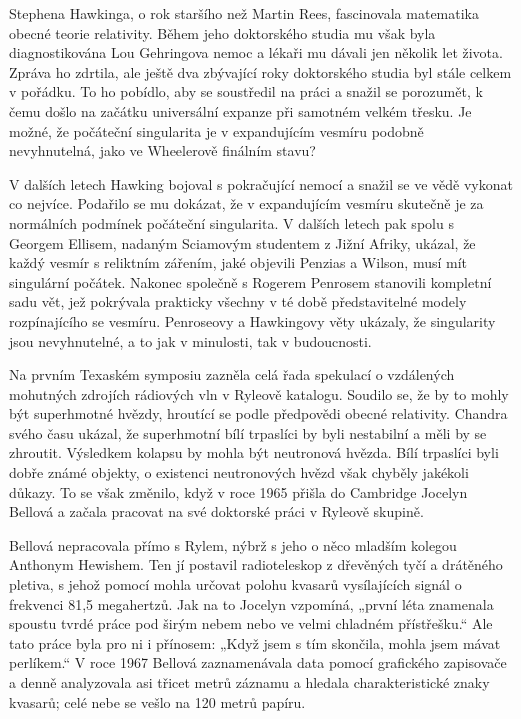   Stephena Hawkinga, o rok staršího než Martin Rees, fascinovala matematika obecné teorie
  relativity. Během jeho doktorského studia mu však byla diagnostikována Lou Gehringova nemoc a
  lékaři mu dávali jen několik let života. Zpráva ho zdrtila, ale ještě dva zbývající roky
  doktorského studia byl stále celkem v pořádku. To ho pobídlo, aby se soustředil na práci a snažil
  se porozumět, k čemu došlo na začátku universální expanze při samotném velkém třesku. Je možné, že
  počáteční singularita je v expandujícím vesmíru podobně nevyhnutelná, jako ve Wheelerově finálním
  stavu? 

  V dalších letech Hawking bojoval s pokračující nemocí a snažil se ve vědě vykonat co nejvíce.
  Podařilo se mu dokázat, že v expandujícím vesmíru skutečně je za normálních podmínek počáteční
  singularita. V dalších letech pak spolu s Georgem Ellisem, nadaným Sciamovým studentem z Jižní
  Afriky, ukázal, že každý vesmír s reliktním zářením, jaké objevili Penzias a Wilson, musí mít
  singulární počátek. Nakonec společně s Rogerem Penrosem stanovili kompletní sadu vět, jež
  pokrývala prakticky všechny v té době představitelné modely rozpínajícího se vesmíru. Penroseovy a
  Hawkingovy věty ukázaly, že singularity jsou nevyhnutelné, a to jak v minulosti, tak v
  budoucnosti. 

  Na prvním Texaském symposiu zazněla celá řada spekulací o vzdálených mohutných zdrojích rádiových
  vln v Ryleově katalogu. Soudilo se, že by to mohly být superhmotné hvězdy, hroutící se podle
  předpovědi obecné relativity. Chandra svého času ukázal, že superhmotní bílí trpaslíci by byli
  nestabilní a měli by se zhroutit. Výsledkem kolapsu by mohla být neutronová hvězda. Bílí trpaslíci
  byli dobře známé objekty, o existenci neutronových hvězd však chyběly jakékoli důkazy. To se však
  změnilo, když v roce 1965 přišla do Cambridge Jocelyn Bellová a začala pracovat na své doktorské
  práci v Ryleově skupině. 

  Bellová nepracovala přímo s Rylem, nýbrž s jeho o něco mladším kolegou Anthonym Hewishem. Ten jí
  postavil radioteleskop z dřevěných tyčí a drátěného pletiva, s jehož pomocí mohla určovat polohu
  kvasarů vysílajících signál o frekvenci 81,5 megahertzů. Jak na to Jocelyn vzpomíná, „první léta
  znamenala spoustu tvrdé práce pod širým nebem nebo ve velmi chladném přístřešku.“ Ale tato práce
  byla pro ni i přínosem: „Když jsem s tím skončila, mohla jsem mávat perlíkem.“ V roce 1967 Bellová
  zaznamenávala data pomocí grafického zapisovače a denně analyzovala asi třicet metrů záznamu a
  hledala charakteristické znaky kvasarů; celé nebe se vešlo na 120 metrů papíru. 

